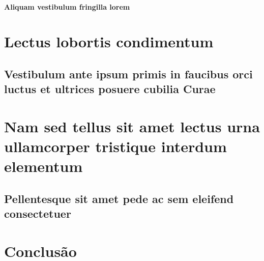 \documentclass[
	12pt,				%
	openright,			%
	twoside,			%
	a4paper,			%
	tcc,			%
]{cct-uenp}
\begin{document}

\subsubsection{Aliquam vestibulum fringilla lorem}



\chapter{Lectus lobortis condimentum}

\section{Vestibulum ante ipsum primis in faucibus orci luctus et ultrices
posuere cubilia Curae}



\chapter{Nam sed tellus sit amet lectus urna ullamcorper tristique interdum
elementum}

\section{Pellentesque sit amet pede ac sem eleifend consectetuer}



\chapter{Conclusão}


\postextual





%
%
\end{document}
